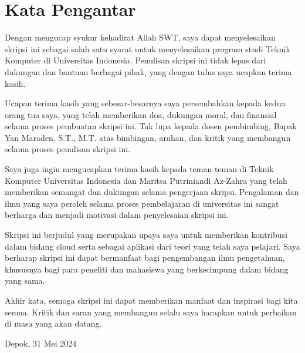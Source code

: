 \chapter*{Kata Pengantar}
Dengan mengucap syukur kehadirat Allah SWT, saya dapat menyelesaikan skripsi ini sebagai salah satu syarat untuk menyelesaikan program studi Teknik Komputer di Universitas Indonesia. Penulisan skripsi ini tidak lepas dari dukungan dan bantuan berbagai pihak, yang dengan tulus saya ucapkan terima kasih.

Ucapan terima kasih yang sebesar-besarnya saya persembahkan kepada kedua orang tua saya, yang telah memberikan doa, dukungan moral, dan finansial selama proses pembuatan skripsi ini. Tak lupa kepada dosen pembimbing, Bapak Yan Maraden, S.T., M.T. atas bimbingan, arahan, dan kritik yang membangun selama proses penulisan skripsi ini.

Saya juga ingin mengucapkan terima kasih kepada teman-teman di Teknik Komputer Universitas Indonesia dan Maritsa Putriniandi Az-Zahra yang telah memberikan semangat dan dukungan selama pengerjaan skripsi. Pengalaman dan ilmu yang saya peroleh selama proses pembelajaran di universitas ini sangat berharga dan menjadi motivasi dalam penyelesaian skripsi ini.

Skripsi ini berjudul \judul yang merupakan upaya saya untuk memberikan kontribusi dalam bidang cloud serta sebagai aplikasi dari teori yang telah saya pelajari. Saya berharap skripsi ini dapat bermanfaat bagi pengembangan ilmu pengetahuan, khususnya bagi para peneliti dan mahasiswa yang berkecimpung dalam bidang yang sama.

Akhir kata, semoga skripsi ini dapat memberikan manfaat dan inspirasi bagi kita semua. Kritik dan saran yang membangun selalu saya harapkan untuk perbaikan di masa yang akan datang.


\vspace*{0.1cm}
\begin{flushright}
	Depok, 31 Mei 2024\\[0.1cm]
	\vspace*{1cm}
	\penulis

\end{flushright}